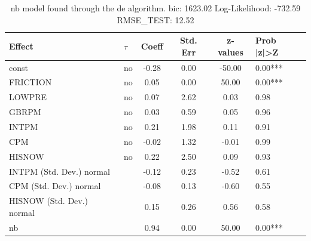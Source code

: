 \begin{table}
	\caption{nb model found through the de algorithm. bic: 1623.02 Log-Likelihood: -732.59 RMSE_TEST: 12.52}
	\begin{center}
		\begin{tabular}{|l|l|c|c|c|l|}
			\hline
			Effect & $\tau$ & Coeff & Std. Err & z-values & Prob |z|>Z \\
			\hline
			const & no & -0.28 & 0.00 & -50.00 & 0.00*** \\
			\hline
			FRICTION & no & 0.05 & 0.00 & 50.00 & 0.00*** \\
			\hline
			LOWPRE & no & 0.07 & 2.62 & 0.03 & 0.98 \\
			\hline
			GBRPM & no & 0.03 & 0.59 & 0.05 & 0.96 \\
			\hline
			INTPM & no & 0.21 & 1.98 & 0.11 & 0.91 \\
			\hline
			CPM & no & -0.02 & 1.32 & -0.01 & 0.99 \\
			\hline
			HISNOW & no & 0.22 & 2.50 & 0.09 & 0.93 \\
			\hline
			INTPM (Std. Dev.) normal &  & -0.12 & 0.23 & -0.52 & 0.61 \\
			\hline
			CPM (Std. Dev.) normal &  & -0.08 & 0.13 & -0.60 & 0.55 \\
			\hline
			HISNOW (Std. Dev.) normal &  & 0.15 & 0.26 & 0.56 & 0.58 \\
			\hline
			nb &  & 0.94 & 0.00 & 50.00 & 0.00*** \\
			\hline
		\end{tabular}
	\end{center}
\end{table}